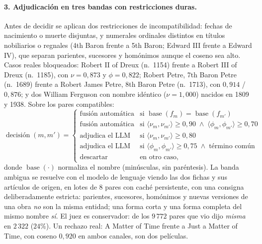 \documentclass[11pt,a4paper]{article}
\newcommand{\op}[1]{\operatorname{#1}}
\begin{document}
\paragraph{3. Adjudicación en tres bandas con restricciones duras.}
Antes de decidir se aplican dos restricciones de incompatibilidad: fechas
de nacimiento o muerte disjuntas, y numerales ordinales distintos en
títulos nobiliarios o regnales (\guillemotleft{}4th Baron\guillemotright{} frente a \guillemotleft{}5th Baron\guillemotright{};
\guillemotleft{}Edward III\guillemotright{} frente a \guillemotleft{}Edward IV\guillemotright{}), que separan parientes, sucesores y
homónimos aunque el coseno sea alto. Casos reales bloqueados: \guillemotleft{}Robert II
of Dreux\guillemotright{} (n.~1154) frente a \guillemotleft{}Robert III of Dreux\guillemotright{} (n.~1185), con
$\nu = 0{,}873$ y $\phi = 0{,}822$; \guillemotleft{}Robert Petre, 7th Baron Petre\guillemotright{} (n.~1689)
frente a \guillemotleft{}Robert James Petre, 8th Baron Petre\guillemotright{} (n.~1713), con
$0{,}914$ / $0{,}876$; y dos \guillemotleft{}William Ferguson\guillemotright{} con nombre idéntico
($\nu = 1{,}000$) nacidos en 1809 y 1938. Sobre los pares compatibles:
\begin{equation}
\op{decisión}(m,m') =
\begin{cases}
\text{fusión automática} & \text{si } \op{base}(f_m)=\op{base}(f_{m'}) \\[2pt]
\text{fusión automática} & \text{si } \langle\nu_m,\nu_{m'}\rangle \geq 0{,}90
                            \;\wedge\; \langle\phi_m,\phi_{m'}\rangle \geq 0{,}70 \\[2pt]
\text{adjudica el LLM} & \text{si } \langle\nu_m,\nu_{m'}\rangle \geq 0{,}80 \\[2pt]
\text{adjudica el LLM} & \text{si } \langle\phi_m,\phi_{m'}\rangle \geq 0{,}75
                            \;\wedge\; \text{término común} \\[2pt]
\text{descartar} & \text{en otro caso,}
\end{cases}
\label{eq:adjudicacion}
\end{equation}
donde $\op{base}(\cdot)$ normaliza el nombre (minúsculas, sin paréntesis).
La banda ambigua se resuelve con el modelo de lenguaje viendo las dos fichas
y sus artículos de origen, en lotes de $8$ pares con caché persistente, con
una consigna deliberadamente estricta: parientes, sucesores, homónimos y
nuevas versiones de una obra \emph{no} son la misma entidad; una forma
corta y una forma completa del mismo nombre \emph{sí}. El juez es
conservador: de los $9\,772$ pares que vio dijo \emph{misma} en $2\,322$
($24\%$). Un rechazo real: \guillemotleft{}A Matter of Time\guillemotright{} frente a \guillemotleft{}Just a Matter of
Time\guillemotright{}, con coseno $0{,}920$ en ambos canales, son dos películas.
\end{document}

